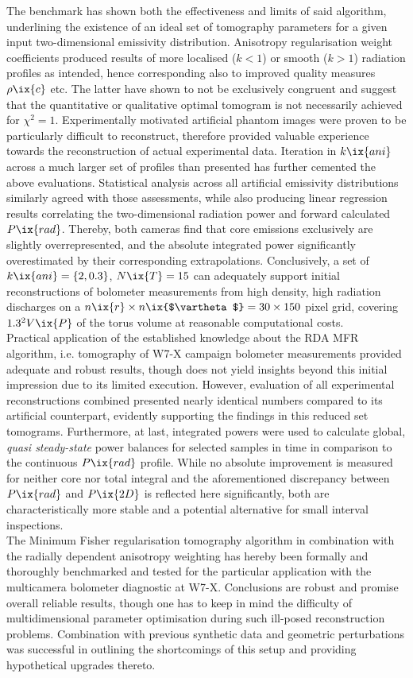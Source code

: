         The benchmark has shown both the effectiveness and limits of said algorithm, underlining the existence of an ideal set of tomography parameters for a given input two-dimensional emissivity distribution. Anisotropy regularisation weight coefficients produced results of more localised ($k<1$) or smooth ($k>1$) radiation profiles as intended, hence corresponding also to improved quality measures $\rho\ix{c}$ etc. The latter have shown to not be exclusively congruent and suggest that the quantitative or qualitative optimal tomogram is not necessarily achieved for $\chi^{2}=1$. Experimentally motivated artificial phantom images were proven to be particularly difficult to reconstruct, therefore provided valuable experience towards the reconstruction of actual experimental data. Iteration in $k\ix{ani}$ across a much larger set of profiles than presented has further cemented the above evaluations. Statistical analysis across all artificial emissivity distributions similarly agreed with those assessments, while also producing linear regression results correlating the two-dimensional radiation power and forward calculated $P\ix{rad}$. Thereby, both cameras find that core emissions exclusively are slightly overrepresented, and the absolute integrated power significantly overestimated by their corresponding extrapolations. Conclusively, a set of $k\ix{ani}=\left\{2, 0.3\right\}$, $N\ix{T}=15$ can adequately support initial reconstructions of bolometer measurements from high density, high radiation discharges on a $n\ix{r}\times n\ix{$\vartheta$}=30\times150$ pixel grid, covering $1.3^{2}V\ix{P}$ of the torus volume at reasonable computational costs.\\%
        Practical application of the established knowledge about the RDA MFR algorithm, i.e. tomography of W7-X campaign bolometer measurements provided adequate and robust results, though does not yield insights beyond this initial impression due to its limited execution. However, evaluation of all experimental reconstructions combined presented nearly identical numbers compared to its artificial counterpart, evidently supporting the findings in this reduced set tomograms. Furthermore, at last, integrated powers were used to calculate global, \textit{quasi steady-state} power balances for selected samples in time in comparison to the continuous $P\ix{rad}$ profile. While no absolute improvement is measured for neither core nor total integral and the aforementioned discrepancy between $P\ix{rad}$ and $P\ix{2D}$ is reflected here significantly, both are characteristically more stable and a potential alternative for small interval inspections.\\%
        The Minimum Fisher regularisation tomography algorithm in combination with the radially dependent anisotropy weighting has hereby been formally and thoroughly benchmarked and tested for the particular application with the multicamera bolometer diagnostic at W7-X. Conclusions are robust and promise overall reliable results, though one has to keep in mind the difficulty of multidimensional parameter optimisation during such ill-posed reconstruction problems. Combination with previous synthetic data and geometric perturbations was successful in outlining the shortcomings of this setup and providing hypothetical upgrades thereto.%
%